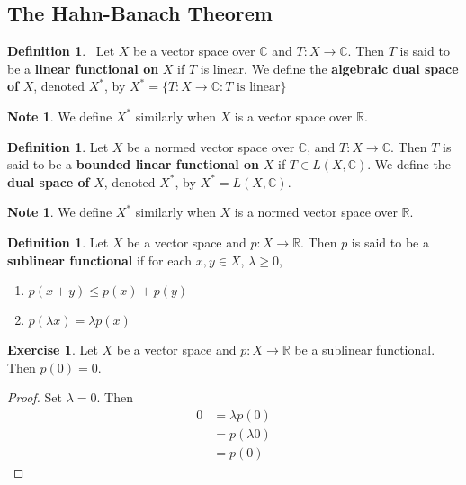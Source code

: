 \documentclass[12pt]{amsart}
\theoremstyle{definition}
\newtheorem{defn}[definition]{Definition}
\newtheorem{note}[definition]{Note}
\newtheorem{ex}[definition]{Exercise}
\newcommand{\lam}{\lambda}
\newcommand{\C}{\mathbb{C}}
\newcommand{\R}{\mathbb{R}}
\newcommand{\lex}[1]{\label{ex:#1}}
\newcommand{\ld}[1]{\label{defn:#1}}
\begin{document}
	
	
	
	
	
	
	
	
	

	

	\newpage
	\subsection{The Hahn-Banach Theorem}
	
	\begin{defn} \ld{}\
	 Let $X$ be a vector space over $\C$ and $T :X \rightarrow \C$. Then $T$ is said to be a \textbf{linear functional on} $X$ if $T$ is linear. We define the \textbf{algebraic dual space of} $X$, denoted $X^*$, by $ X^* = \{ T:X \rightarrow \C: T \text{ is linear} \} $
	\end{defn}
	
	\begin{note}
	We define $X^*$ similarly when $X$ is a vector space  over $\R$.
	\end{note}
	
	\begin{defn}
	Let $X$ be a normed vector space over $\C$, and $T :X \rightarrow \C$. Then $T$ is said to be a \textbf{bounded linear functional on} $X$ if $T \in L(X, \C)$. We define the \textbf{dual space of} $X$, denoted $X^*$, by $X^* = L(X, \C)$.
	\end{defn}
	
	\begin{note}
	We define $X^*$ similarly when $X$ is a normed vector space over $\R$.
	\end{note}
	
	\begin{defn} \ld{}
		Let $X$ be a vector space and $p:X \rightarrow \R$. Then $p$ is said to be a \textbf{sublinear functional} if for each $x,y \in X$, $\lam \geq 0$, 
		\begin{enumerate}
			\item $p(x+y) \leq p(x) + p(y)$
			\item $p(\lam x ) = \lam p(x)$
		\end{enumerate}  
	\end{defn}
	
	\begin{ex} \lex{}
		Let $X$ be a vector space and $p: X \rightarrow \R$ be a sublinear functional. Then $p(0) = 0$.
	\end{ex}
	
	\begin{proof} Set $\lam = 0$. Then 
	\begin{align*}
	0
	&= \lam p(0) \\
	&= p(\lam 0) \\
	&= p(0)
	\end{align*}
	\end{proof}
	
\end{document}
